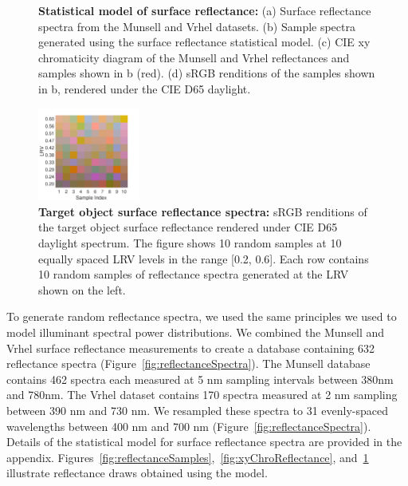 \documentclass{jov}
\begin{document}
\begin{figure}
\begin{subfigure}{0.24 \textwidth}
        \label{fig:backgroundSwatches}
    \end{subfigure}
    \caption{{\bf Statistical model of surface reflectance:} (a) Surface reflectance spectra from the Munsell and Vrhel datasets. (b) Sample spectra generated using the surface reflectance statistical model. (c) CIE xy chromaticity diagram of the Munsell and Vrhel reflectances and samples shown in b (red). (d) sRGB renditions of the samples shown in b, rendered under the CIE D65 daylight.}
\label{fig:surfaceReflectanceGeneration}
\end{figure}

\begin{figure}
\centering
\includegraphics[width=0.3\textwidth]{../FiguresDraft4/Figure8/Figure8.pdf}
\caption{{\bf Target object surface reflectance spectra:} sRGB renditions of the target object surface reflectance rendered under CIE D65 daylight spectrum. The figure shows 10 random samples at 10 equally spaced LRV levels in the range [0.2, 0.6]. Each row contains 10 random samples of reflectance spectra generated at the LRV shown on the left.}
\label{fig:targetSwatches}
\end{figure}

To generate random reflectance spectra, we used the same principles we used to model illuminant spectral power distributions.
We combined the Munsell \cite{kelly1943tristimulus} and Vrhel \cite{vrhel1994measurement} surface reflectance 
measurements to create a database containing 632 reflectance spectra (Figure~\ref{fig:reflectanceSpectra}).
The Munsell database contains 462 spectra each measured at 5 nm sampling intervals between 380nm and 780nm.
The Vrhel dataset contains 170 spectra measured at 2 nm sampling between 390 nm and 730 nm.
We resampled these spectra to 31 evenly-spaced wavelengths between 400 nm and 700 nm (Figure~\ref{fig:reflectanceSpectra}).
Details of the statistical model for surface reflectance spectra are provided in the appendix. 
Figures~\ref{fig:reflectanceSamples},~\ref{fig:xyChroReflectance}, and~\ref{fig:backgroundSwatches} illustrate reflectance draws obtained using the model. 
\end{document}
